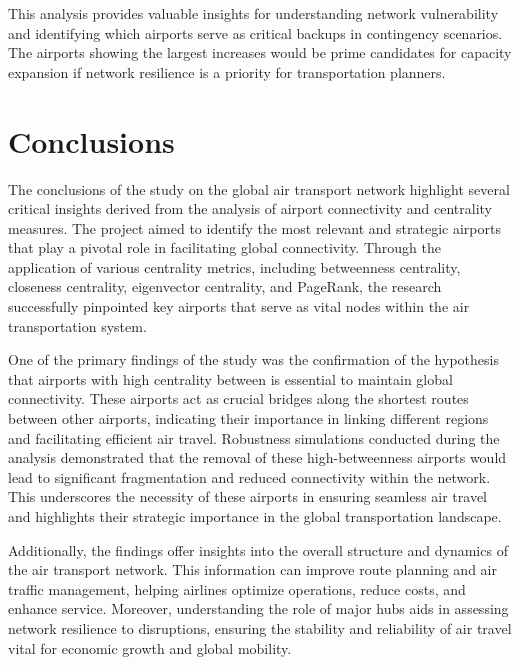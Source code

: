 \documentclass[12pt]{article}
\begin{document}
    This analysis provides valuable insights for understanding network vulnerability and identifying which airports serve as critical backups in contingency scenarios. The airports showing the largest increases would be prime candidates for capacity expansion if network resilience is a priority for transportation planners.


    \section{Conclusions}\label{sec:conclusions}
    The conclusions of the study on the global air transport network highlight several critical insights derived from the analysis of airport connectivity and centrality measures. The project aimed to identify the most relevant and strategic airports that play a pivotal role in facilitating global connectivity. Through the application of various centrality metrics, including betweenness centrality, closeness centrality, eigenvector centrality, and PageRank, the research successfully pinpointed key airports that serve as vital nodes within the air transportation system.

    One of the primary findings of the study was the confirmation of the hypothesis that airports with high centrality between is essential to maintain global connectivity. These airports act as crucial bridges along the shortest routes between other airports, indicating their importance in linking different regions and facilitating efficient air travel. Robustness simulations conducted during the analysis demonstrated that the removal of these high-betweenness airports would lead to significant fragmentation and reduced connectivity within the network. This underscores the necessity of these airports in ensuring seamless air travel and highlights their strategic importance in the global transportation landscape.

    Additionally, the findings offer insights into the overall structure and dynamics of the air transport network. This information can improve route planning and air traffic management, helping airlines optimize operations, reduce costs, and enhance service. Moreover, understanding the role of major hubs aids in assessing network resilience to disruptions, ensuring the stability and reliability of air travel vital for economic growth and global mobility.
\end{document}
